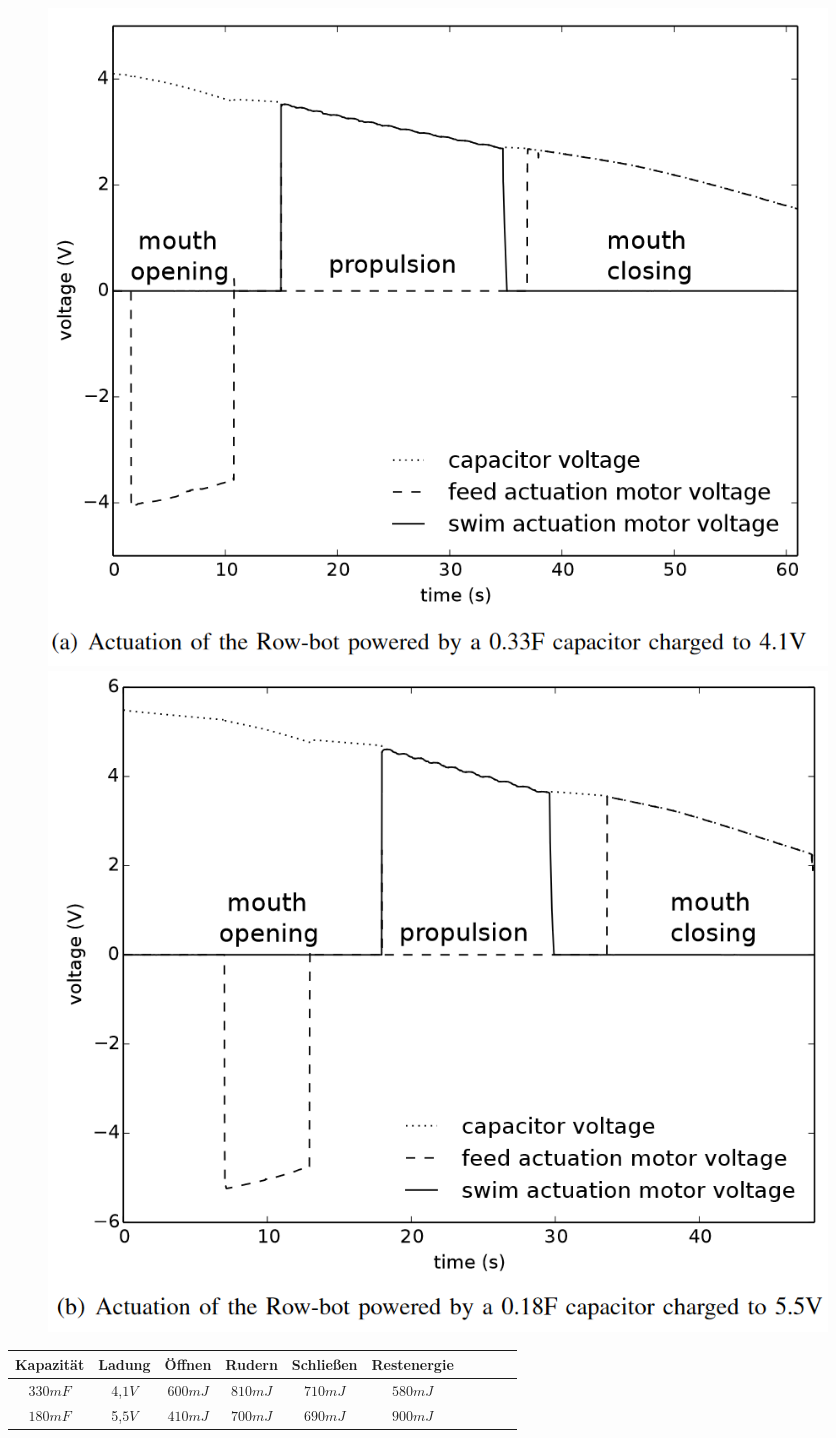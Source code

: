 \documentclass{SeminarV2}
\begin{document}
\begin{figure}[ht]
  \includegraphics[width=0.7\linewidth]{pics/33}
\endminipage\hfill
{}
  \includegraphics[width=0.7\linewidth]{pics/18}
\endminipage\hfill
{}
\end{figure}

\begin{table}[h!]
  \centering
  \begin{tabular}{|c|c|c|c|c|c|c|c|c|c|}
    \hline
    Kapazität & Ladung & Öffnen & Rudern & Schließen &  Restenergie\\
    \hline
    $330mF$ & 4,$1V$ & $600mJ$ & $810mJ$ & $710mJ$ & $580mJ$ \\
    $180mF$ & 5,$5V$ & $410mJ$ & $700mJ$ & $690mJ$ & $900mJ$ \\
    \hline
  \end{tabular}
\end{table}
\end{document}
